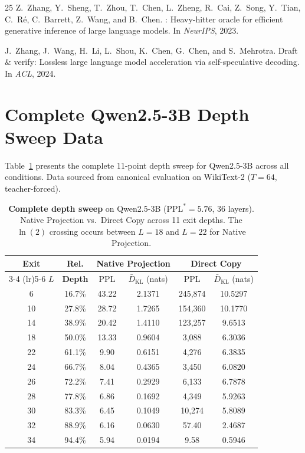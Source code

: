 \documentclass{article}
\newcommand{\kl}{\bar{D}_{\mathrm{KL}}}
\begin{document}
\begin{thebibliography}{25}
Z.~Zhang, Y.~Sheng, T.~Zhou, T.~Chen, L.~Zheng, R.~Cai, Z.~Song, Y.~Tian, C.~Ré, C.~Barrett, Z.~Wang, and B.~Chen.
: Heavy-hitter oracle for efficient generative inference of large language models.
\newblock In \emph{NeurIPS}, 2023.

J.~Zhang, J.~Wang, H.~Li, L.~Shou, K.~Chen, G.~Chen, and S.~Mehrotra.
\newblock Draft \& verify: Lossless large language model acceleration via self-speculative decoding.
\newblock In \emph{ACL}, 2024.

\end{thebibliography}

\newpage
\appendix

\section{Complete Qwen2.5-3B Depth Sweep Data}
\label{app:full_sweep}

Table~\ref{tab:full_sweep} presents the complete 11-point depth sweep for Qwen2.5-3B across all conditions. Data sourced from canonical evaluation on WikiText-2 ($T{=}64$, teacher-forced).

\begin{table}[h]
\centering
\caption{\textbf{Complete depth sweep} on Qwen2.5-3B ($\text{PPL}^* = 5.76$, 36 layers). Native Projection vs.\ Direct Copy across 11 exit depths. The $\ln(2)$ crossing occurs between $L{=}18$ and $L{=}22$ for Native Projection.}
\label{tab:full_sweep}
\small
\begin{tabular}{@{}cccccc@{}}
\toprule
\textbf{Exit} & \textbf{Rel.} & \multicolumn{2}{c}{\textbf{Native Projection}} & \multicolumn{2}{c}{\textbf{Direct Copy}} \\
\cmidrule(lr){3-4} \cmidrule(lr){5-6}
$L$ & \textbf{Depth} & PPL & $\kl$ (nats) & PPL & $\kl$ (nats) \\
\midrule
6 & 16.7\% & 43.22 & 2.1371 & 245,874 & 10.5297 \\
10 & 27.8\% & 28.72 & 1.7265 & 154,360 & 10.1770 \\
14 & 38.9\% & 20.42 & 1.4110 & 123,257 & 9.6513 \\
18 & 50.0\% & 13.33 & 0.9604 & 3,088 & 6.3036 \\
22 & 61.1\% & 9.90 & 0.6151 & 4,276 & 6.3835 \\
24 & 66.7\% & 8.04 & 0.4365 & 3,450 & 6.0820 \\
26 & 72.2\% & 7.41 & 0.2929 & 6,133 & 6.7878 \\
28 & 77.8\% & 6.86 & 0.1692 & 4,349 & 5.9263 \\
30 & 83.3\% & 6.45 & 0.1049 & 10,274 & 5.8089 \\
32 & 88.9\% & 6.16 & 0.0630 & 57.40 & 2.4687 \\
34 & 94.4\% & 5.94 & 0.0194 & 9.58 & 0.5946 \\
\bottomrule
\end{tabular}
\end{table}
\end{document}
